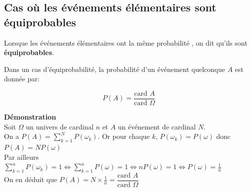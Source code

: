 \subsection*{Cas où les événements élémentaires sont équiprobables }
\begin{definition}
Lorsque les événements élémentaires ont la même probabilité , on dit qu’ils sont \textbf{ équiprobables}.
\end{definition}
\begin{property}
Dans un cas d’équiprobabilité, la probabilité d’un événement quelconque  $A$ est donnée par:

$$ P(A)=\dfrac{\text{card }A}{\text{card } \Omega}$$
\end{property}
\textbf{Démonstration}\\
Soit $ \Omega $ un univers  de cardinal $ n$
et  $ A $ un événement de cardinal $ N. $\\
On a $ P(A)= \displaystyle\sum_{k=1}^N P(\omega_{k})$. Or pour chaque $ k $,  $ P (\omega_{k})=P(\omega) $  donc $ P(A)=N P(\omega )$\\
Par ailleurs $ \displaystyle \sum_{k=1}^n P(\omega_{k})=1  \Longleftrightarrow  \sum_{k=1}^n P(\omega)=1  \Longleftrightarrow n P(\omega) =1 \Longleftrightarrow P(\omega) =\frac{1}{n}$\\ On en déduit que $ P(A)=N\times   \frac{1}{n}= \dfrac{\text{card }A}{\text{card }\Omega}$

